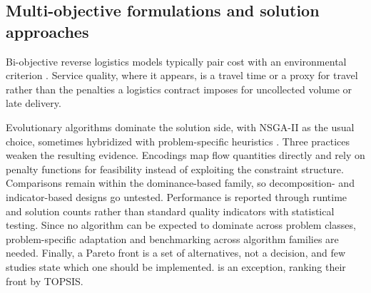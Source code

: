 \documentclass[11pt, a4paper]{article}
\begin{document}
\subsection{Multi-objective formulations and solution approaches}
Bi-objective reverse logistics models typically pair cost with an environmental criterion \citep{Zhen2019, De2020, Sadeghi2021, Liao2022, argoubi2026sustainable}. Service quality, where it appears, is a travel time or a proxy for travel rather than the penalties a logistics contract imposes for uncollected volume or late delivery.

Evolutionary algorithms dominate the solution side, with NSGA-II \citep{Kdeb2002} as the usual choice, sometimes hybridized with problem-specific heuristics \citep{Nohkim2019, Gholizadeh2022, zhang2026ansga}. Three practices weaken the resulting evidence. Encodings map flow quantities directly and rely on penalty functions for feasibility instead of exploiting the constraint structure. Comparisons remain within the dominance-based family, so decomposition- and indicator-based designs go untested. Performance is reported through runtime and solution counts rather than standard quality indicators with statistical testing. Since no algorithm can be expected to dominate across problem classes, problem-specific adaptation and benchmarking across algorithm families are needed. Finally, a Pareto front is a set of alternatives, not a decision, and few studies state which one should be implemented. \citet{halder2025multi} is an exception, ranking their front by TOPSIS.
\end{document}
